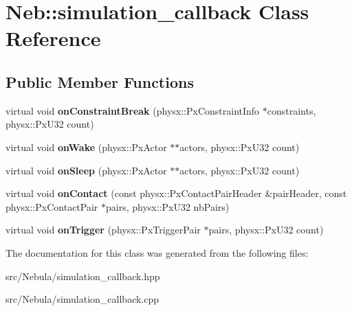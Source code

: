 \hypertarget{classNeb_1_1simulation__callback}{\section{\-Neb\-:\-:simulation\-\_\-callback \-Class \-Reference}
\label{classNeb_1_1simulation__callback}
}
\subsection*{\-Public \-Member \-Functions}
\begin{DoxyCompactItemize}
\item 
\hypertarget{classNeb_1_1simulation__callback_a19793cdc33472be18f7839fb2d7fea97}{virtual void {\bfseries on\-Constraint\-Break} (physx\-::\-Px\-Constraint\-Info $\ast$constraints, physx\-::\-Px\-U32 count)}\label{classNeb_1_1simulation__callback_a19793cdc33472be18f7839fb2d7fea97}

\item 
\hypertarget{classNeb_1_1simulation__callback_ae3c155b2b77603562be48c4e67fa8026}{virtual void {\bfseries on\-Wake} (physx\-::\-Px\-Actor $\ast$$\ast$actors, physx\-::\-Px\-U32 count)}\label{classNeb_1_1simulation__callback_ae3c155b2b77603562be48c4e67fa8026}

\item 
\hypertarget{classNeb_1_1simulation__callback_ab5f0852a4102fc6adf5a981803b11fc9}{virtual void {\bfseries on\-Sleep} (physx\-::\-Px\-Actor $\ast$$\ast$actors, physx\-::\-Px\-U32 count)}\label{classNeb_1_1simulation__callback_ab5f0852a4102fc6adf5a981803b11fc9}

\item 
\hypertarget{classNeb_1_1simulation__callback_a81d02ce1df83fbec396560c9f250e9a1}{virtual void {\bfseries on\-Contact} (const physx\-::\-Px\-Contact\-Pair\-Header \&pair\-Header, const physx\-::\-Px\-Contact\-Pair $\ast$pairs, physx\-::\-Px\-U32 nb\-Pairs)}\label{classNeb_1_1simulation__callback_a81d02ce1df83fbec396560c9f250e9a1}

\item 
\hypertarget{classNeb_1_1simulation__callback_a380b0166d2a5313df0a257960f069672}{virtual void {\bfseries on\-Trigger} (physx\-::\-Px\-Trigger\-Pair $\ast$pairs, physx\-::\-Px\-U32 count)}\label{classNeb_1_1simulation__callback_a380b0166d2a5313df0a257960f069672}

\end{DoxyCompactItemize}


\-The documentation for this class was generated from the following files\-:\begin{DoxyCompactItemize}
\item 
src/\-Nebula/simulation\-\_\-callback.\-hpp\item 
src/\-Nebula/simulation\-\_\-callback.\-cpp\end{DoxyCompactItemize}
